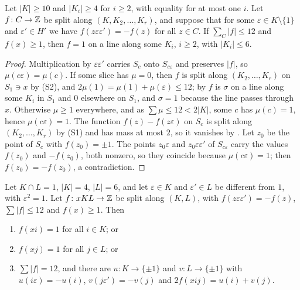 \begin{lemma}\label{lem:oddbig}
Let $|K|\ge10$ and $|K_{i}|\ge4$ for $i\ge2$, with equality for at most one
$i$. Let $f\colon C\to\mathbb{Z}$ be split along $(K,K_{2},\dots,K_{r})$, and suppose
that for some $\varepsilon\in K\setminus\{1\}$ and $\varepsilon'\in H'$ we
have $f(z\varepsilon\varepsilon')=-f(z)$ for all $z\in C$. If $\sum_{C}|f|\le
12$ and $f(x)\ge1$, then $f=1$ on a line along some $K_{i}$, $i\ge2$, with
$|K_{i}|\le6$.
\end{lemma}

\begin{proof}
Multiplication by $\varepsilon\varepsilon'$ carries $S_{c}$ onto
$S_{c\varepsilon}$ and preserves $|f|$, so $\mu(c\varepsilon)=\mu(c)$. If
some slice has $\mu=0$, then $f$ is split along $(K_{2},\dots,K_{r})$ on
$S_{1}\ni x$ by (S2), and $2\mu(1)=\mu(1)+\mu(\varepsilon)\le12$; by
 $f$ is $\sigma$ on a line along some $K_{i}$ in $S_{1}$ and $0$
elsewhere on $S_{1}$, and $\sigma=1$ because the line passes through $x$.
Otherwise $\mu\ge1$ everywhere, and as $\sum\mu\le12<2|K|$, some $c$ has
$\mu(c)=1$, hence $\mu(c\varepsilon)=1$. The function $f(z)-f(z\varepsilon)$
on $S_{c}$ is split along $(K_{2},\dots,K_{r})$ by (S1) and has mass at most
$2$, so it vanishes by . Let $z_{0}$ be the point of $S_{c}$
with $f(z_{0})=\pm1$. The points $z_{0}\varepsilon$ and
$z_{0}\varepsilon\varepsilon'$ of $S_{c\varepsilon}$ carry the values
$f(z_{0})$ and $-f(z_{0})$, both nonzero, so they coincide because
$\mu(c\varepsilon)=1$; then $f(z_{0})=-f(z_{0})$, a contradiction.
\end{proof}

\begin{lemma}\label{lem:twoD}
Let $K\cap L=1$, $|K|=4$, $|L|=6$, and let $\varepsilon\in K$ and
$\varepsilon'\in L$ be different from $1$, with $\varepsilon^{2}=1$. Let
$f\colon xKL\to\mathbb{Z}$ be split along $(K,L)$, with $f(z\varepsilon
\varepsilon')=-f(z)$, $\sum|f|\le12$ and $f(x)\ge1$. Then
\begin{enumerate}[label=\textup{(\alph*)}]
\item $f(xi)=1$ for all $i\in K$; or
\item $f(xj)=1$ for all $j\in L$; or
\item $\sum|f|=12$, and there are $u\colon K\to\{\pm1\}$ and $v\colon
L\to\{\pm1\}$ with $u(i\varepsilon)=-u(i)$, $v(j\varepsilon')=-v(j)$ and
$2f(xij)=u(i)+v(j)$.
\end{enumerate}
\end{lemma}

